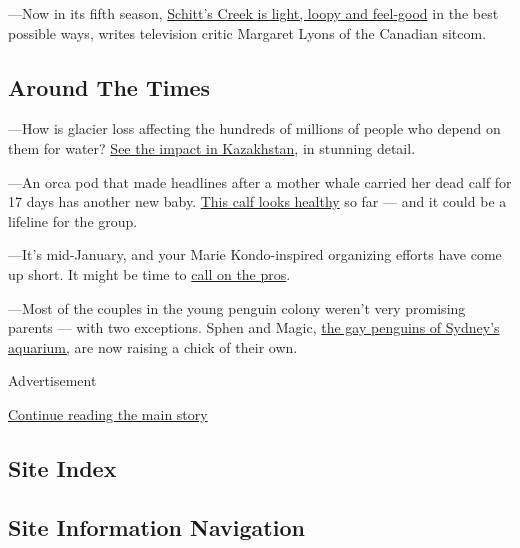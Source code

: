 ---Now in its fifth season,
\href{https://www.nytimes.com/2019/01/15/arts/television/schitts-creek-season-5.html}{Schitt's
Creek is light, loopy and feel-good} in the best possible ways, writes
television critic Margaret Lyons of the Canadian sitcom.

\hypertarget{around-the-times}{%
\subsection{Around The Times}\label{around-the-times}}

---How is glacier loss affecting the hundreds of millions of people who
depend on them for water?
\href{https://www.nytimes.com/interactive/2019/01/15/climate/melting-glaciers-globally.html?emc=edit_aust_20190117\&nl=nyt-australia\&nlid=6007619620190117\&te=1}{See
the impact in Kazakhstan}, in stunning detail.

---An orca pod that made headlines after a mother whale carried her dead
calf for 17 days has another new baby.
\href{https://www.nytimes.com/2019/01/17/science/orca-calf-seattle.html}{This
calf looks healthy} so far --- and it could be a lifeline for the group.

---It's mid-January, and your Marie Kondo-inspired organizing efforts
have come up short. It might be time to
\href{https://www.nytimes.com/2019/01/16/smarter-living/professional-organizers-productivity-clutter.html?fallback=0\&recId=1FukyvaGEjyn7aw714343SyAc60\&locked=1\&geoContinent=NA\&geoRegion=ON\&recAlloc=control\&geoCountry=CA\&blockId=home-living-vi\&imp_id=139870849\&action=click\&module=Smarter\%20Living\&pgtype=Homepage}{call
on the pros}.

---Most of the couples in the young penguin colony weren't very
promising parents --- with two exceptions. Sphen and Magic,
\href{https://www.nytimes.com/2019/01/15/style/gay-penguins-australia.html}{the
gay penguins of Sydney's aquarium,} are now raising a chick of their
own.

Advertisement

\protect\hyperlink{after-bottom}{Continue reading the main story}

\hypertarget{site-index}{%
\subsection{Site Index}\label{site-index}}

\hypertarget{site-information-navigation}{%
\subsection{Site Information
Navigation}\label{site-information-navigation}}


